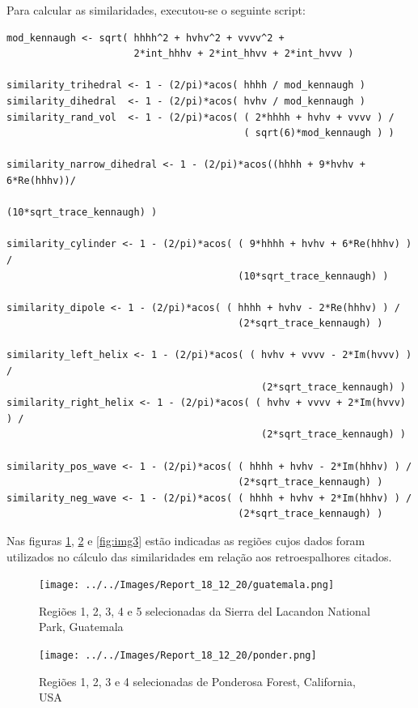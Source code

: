 \documentclass[12pt]{article}
\begin{document}
Para calcular as similaridades, executou-se o seguinte script:
\begin{verbatim}
mod_kennaugh <- sqrt( hhhh^2 + hvhv^2 + vvvv^2 + 
                      2*int_hhhv + 2*int_hhvv + 2*int_hvvv )

similarity_trihedral <- 1 - (2/pi)*acos( hhhh / mod_kennaugh )
similarity_dihedral  <- 1 - (2/pi)*acos( hvhv / mod_kennaugh )
similarity_rand_vol  <- 1 - (2/pi)*acos( ( 2*hhhh + hvhv + vvvv ) / 
                                         ( sqrt(6)*mod_kennaugh ) )
                                         
similarity_narrow_dihedral <- 1 - (2/pi)*acos((hhhh + 9*hvhv + 6*Re(hhhv))/
                                                (10*sqrt_trace_kennaugh) )

similarity_cylinder <- 1 - (2/pi)*acos( ( 9*hhhh + hvhv + 6*Re(hhhv) ) /
                                        (10*sqrt_trace_kennaugh) )

similarity_dipole <- 1 - (2/pi)*acos( ( hhhh + hvhv - 2*Re(hhhv) ) /
                                        (2*sqrt_trace_kennaugh) )

similarity_left_helix <- 1 - (2/pi)*acos( ( hvhv + vvvv - 2*Im(hvvv) ) /
                                            (2*sqrt_trace_kennaugh) )
similarity_right_helix <- 1 - (2/pi)*acos( ( hvhv + vvvv + 2*Im(hvvv) ) /
                                            (2*sqrt_trace_kennaugh) )

similarity_pos_wave <- 1 - (2/pi)*acos( ( hhhh + hvhv - 2*Im(hhhv) ) /
                                        (2*sqrt_trace_kennaugh) )
similarity_neg_wave <- 1 - (2/pi)*acos( ( hhhh + hvhv + 2*Im(hhhv) ) /
                                        (2*sqrt_trace_kennaugh) )
\end{verbatim}

Nas figuras \ref{fig:img1}, \ref{fig:img2} e \ref{fig:img3} estão indicadas as regiões cujos dados foram utilizados no cálculo das similaridades em relação aos retroespalhores citados.

\begin{figure}[!h]
    \centering
    \texttt{[image: ../../Images/Report\_18\_12\_20/guatemala.png]}
    \caption{Regiões 1, 2, 3, 4 e 5 selecionadas da Sierra del Lacandon National Park, Guatemala}
    \label{fig:img1}
\end{figure}

\begin{figure}[!h]
    \centering
    \texttt{[image: ../../Images/Report\_18\_12\_20/ponder.png]}
    \caption{Regiões 1, 2, 3 e 4 selecionadas de Ponderosa Forest, California, USA}
    \label{fig:img2}
\end{figure}
\end{document}
